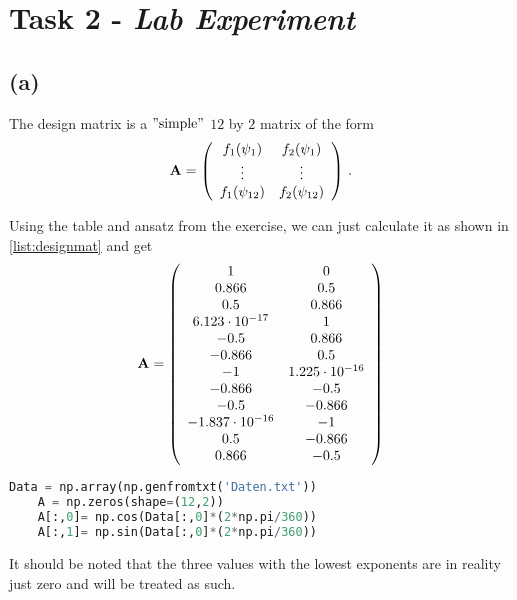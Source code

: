 \section{Task 2 - \textit{Lab Experiment}}

\subsection*{(a)}

The design matrix is a $"\text{simple}"$ $12$ by $2$ matrix of the form
\begin{equation*}
    \textbf{A} = \left(
        \begin{array}{c c}
            f_1(\psi_1) & f_2(\psi_1) \\
            \vdots & \vdots \\
            f_1(\psi_{12}) & f_2(\psi_{12}) \\
        \end{array}
    \right) \,.
\end{equation*}

Using the table and ansatz from the exercise, we can just calculate it as shown in \autoref{list:designmat} and get
\begin{equation*}
    \textbf{A} = \left(
        \begin{array}{c c}
             1                    &  0  \\
             0.866                &  0.5 \\
             0.5                  &  0.866 \\
             6.123 \cdot 10^{-17}  &  1 \\
            -0.5                  &  0.866 \\
            -0.866                &  0.5 \\
            -1                    &  1.225 \cdot 10^{-16} \\
            -0.866                & -0.5 \\
            -0.5                  & -0.866 \\
            -1.837 \cdot 10^{-16} & -1 \\
            0.5                   & -0.866 \\
            0.866                 & -0.5 \\
        \end{array}
    \right)
\end{equation*}

\begin{lstlisting}[language = Python, caption={Calculation of design matrix \textbf{A}.}, label = {list:designmat}]
    Data = np.array(np.genfromtxt('Daten.txt'))
    A = np.zeros(shape=(12,2))
    A[:,0]= np.cos(Data[:,0]*(2*np.pi/360))
    A[:,1]= np.sin(Data[:,0]*(2*np.pi/360))
\end{lstlisting}


It should be noted that the three values with the lowest exponents are in reality just zero and will be treated as such.


